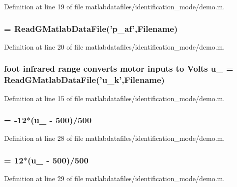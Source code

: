 Definition at line 19 of file matlabdatafiles/identification\_\-mode/demo.m.
\subsubsection[{theta\_\-3}]{ = ReadGMatlabDataFile('p\_\-af',{\bf Filename})}\label{matlabdatafiles_2identification__mode_2demo_8m_abbb2a4909669066c03b01bec6b92aadc}


Definition at line 20 of file matlabdatafiles/identification\_\-mode/demo.m.
\subsubsection[{u\_\-1}]{\setlength{\rightskip}{0pt plus 5cm}foot infrared range converts motor inputs to Volts {\bf u\_} = ReadGMatlabDataFile('{\bf u\_\-k}',{\bf Filename})}\label{matlabdatafiles_2identification__mode_2demo_8m_ace7b203e012b8b638d98a1d4ef4a10bb}


Definition at line 15 of file matlabdatafiles/identification\_\-mode/demo.m.
\subsubsection[{u\_\-2}]{ = -\/12$\ast$({\bf u\_} -\/ 500)/500}\label{matlabdatafiles_2identification__mode_2demo_8m_a3d5b0d701fb4fdc2c6b27abaf5c6b5c8}


Definition at line 28 of file matlabdatafiles/identification\_\-mode/demo.m.
\subsubsection[{u\_\-3}]{ = 12$\ast$({\bf u\_} -\/ 500)/500}\label{matlabdatafiles_2identification__mode_2demo_8m_a9ab9ff12ff95c55341941011872c456a}


Definition at line 29 of file matlabdatafiles/identification\_\-mode/demo.m.
